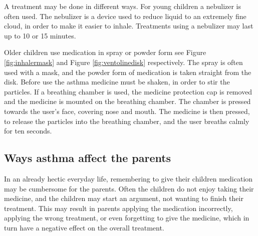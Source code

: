 A treatment may be done in different ways. For young children a nebulizer is often used. The nebulizer is a device used to reduce liquid to an extremely fine cloud, in order to make it easier to inhale. Treatments using a nebulizer may last up to 10 or 15 minutes.

Older children use medication in spray or powder form see Figure \ref{fig:inhalermask} and Figure \ref{fig:ventolinedisk} respectively. The spray is often used with a mask, and the powder form of medication is taken straight from the disk. Before use the asthma medicine must be shaken, in order to stir the particles. If a breathing chamber is used, the medicine protection cap is removed and the medicine is mounted on the breathing chamber. The chamber is pressed towards the user's face, covering nose and mouth. The medicine is then pressed, to release the particles into the breathing chamber, and the user breaths calmly for ten seconds. 

\subsection{Ways asthma affect the parents}
In an already hectic everyday life, remembering to give their children medication may be cumbersome for the parents. Often the children do not enjoy taking their medicine, and the children may start an argument, not wanting to finish their treatment. This may result in parents applying the medication incorrectly, applying the wrong treatment, or even forgetting to give the medicine, which in turn have a negative effect on the overall treatment.  


